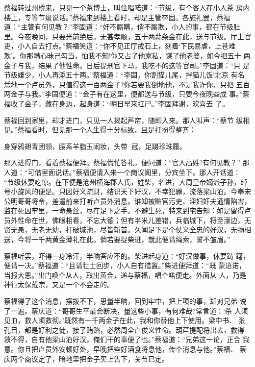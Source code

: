 蔡福转过州桥来，只见一个茶博士，叫住唱喏道：“节级，有个客人在小人茶
房内楼上，专等节级说话。”蔡福来到楼上看时，却是主管李固。各施礼罢，蔡福
道：“主管有何见教？”李固道：“奸不厮瞒，俏不厮欺，小人的事，都在节级肚
里。今夜晚间，只要光前绝后。无甚孝顺，五十两蒜条金在此，送与节级。厅上官
吏，小人自去打点。”蔡福笑道：“你不见正厅戒石上，刻着‘下民易虐，上苍难
欺’。你那瞒心昧己勾当，怕我不知!你又占了他家私，谋了他老婆，如今把五十
两金子与我，结果了他性命。日后提刑官下马，我吃不的这等官司。”李固道：“只
是节级嫌少，小人再添五十两。”蔡福道：“李固，你割猫儿尾，拌猫儿饭!北京
有名恁地一个卢员外，只值得这一百两金子?你若要我倒地他，不是我诈你，只把
五百两金子与我。”李固便道：“金子有在这里，便都送与节级，只要今夜晚些成
事。”蔡福收了金子，藏在身边，起身道：“明日早来扛尸。”李固拜谢，欢喜去
了。

蔡福回到家里，却才进门，只见一人揭起芦帘，随即入来。那人叫声：“蔡节
级相见。”蔡福看时，但见那一个人生得十分标致，且是打扮得整齐：

身穿鸦翅青团领，腰系羊脂玉闹妆，头带冠，足蹑珍珠履。

那人进得门，看着蔡福便拜。蔡福慌忙答礼，便问道：“官人高姓?有何见教？”
那人道：“可借里面说话。”蔡福便请入来一个商议阁里，分宾坐下。那人开话道：
“节级休要吃惊。在下便是沧州横海郡人氏，姓柴，名进，大周皇帝嫡派子孙，绰
号小旋风的便是。只因好义疏财，结识天下好汉，不幸犯罪，流落梁山泊。今奉宋
公明哥哥将令，差遣前来打听卢员外消息。谁知被赃官污吏、淫妇奸夫通情陷害，
监在死囚牢里，一命悬丝，尽在足下之手。不避生死，特来到宅告知：如是留得卢
员外性命在世，佛眼相看，不忘大德；但有半米儿差错，兵临城下，将至濠边，无
贤无愚，无老无幼，打破城池，尽皆斩首。久闻足下是个仗义全忠的好汉，无物相
送，今将一千两黄金薄礼在此。倘若要捉柴进，就此便请绳索，誓不皱眉。”

蔡福听罢，吓得一身冷汗，半晌答应不的。柴进起身道：“好汉做事，休要踌
躇，便请一决。”蔡福道：“且请壮士回步，小人自有措置。”柴进便拜道：“既
蒙语诺，当报大恩。”出门唤个从人，取出黄金，递与蔡福，唱个喏便走。外面从
人，乃是神行太保戴宗，又是一个不会走的。

蔡福得了这个消息，摆拨不下，思量半晌，回到牢中，把上项的事，却对兄弟
说了一遍。蔡庆道：“哥哥生平最会断决，量这些小事，有何难哉?常言道：‘杀
人须见血，救人须救彻。’既然有一千两金子在此，我和你替他上下使用。梁中书、
张孔目，都是好利之徒，接了贿赂，必然周全卢俊义性命。葫芦提配将出去，救得
救不得，自有他梁山泊好汉，俺们干的事便了也。”蔡福道：“兄弟这一论，正合
我意。你且把卢员外安顿好处，早晚把些好酒食将息他，传个消息与他。”蔡福、
蔡庆两个商议定了，暗地里把金子买上告下，关节已定。

